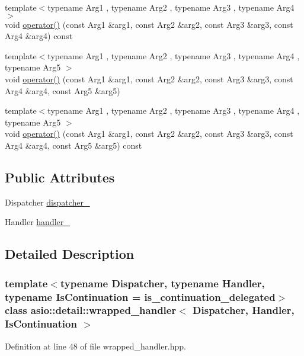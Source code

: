 \begin{DoxyCompactItemize}
\item 
{\footnotesize template$<$typename Arg1 , typename Arg2 , typename Arg3 , typename Arg4 $>$ }\\void \hyperlink{classasio_1_1detail_1_1wrapped__handler_a52b441e6137fb8753bb75648bbd1c98d}{operator()} (const Arg1 \&arg1, const Arg2 \&arg2, const Arg3 \&arg3, const Arg4 \&arg4) const 
\item 
{\footnotesize template$<$typename Arg1 , typename Arg2 , typename Arg3 , typename Arg4 , typename Arg5 $>$ }\\void \hyperlink{classasio_1_1detail_1_1wrapped__handler_a63973584d48d19bee721adb2448d73f3}{operator()} (const Arg1 \&arg1, const Arg2 \&arg2, const Arg3 \&arg3, const Arg4 \&arg4, const Arg5 \&arg5)
\item 
{\footnotesize template$<$typename Arg1 , typename Arg2 , typename Arg3 , typename Arg4 , typename Arg5 $>$ }\\void \hyperlink{classasio_1_1detail_1_1wrapped__handler_a381c918e444879c3b5d1a2a008533d84}{operator()} (const Arg1 \&arg1, const Arg2 \&arg2, const Arg3 \&arg3, const Arg4 \&arg4, const Arg5 \&arg5) const 
\end{DoxyCompactItemize}
\subsection*{Public Attributes}
\begin{DoxyCompactItemize}
\item 
Dispatcher \hyperlink{classasio_1_1detail_1_1wrapped__handler_a1b5a895a84ecb42ec106dedb0d71bc99}{dispatcher\+\_\+}
\item 
Handler \hyperlink{classasio_1_1detail_1_1wrapped__handler_ad69cf050b6945ca618f0015ca2c28f98}{handler\+\_\+}
\end{DoxyCompactItemize}


\subsection{Detailed Description}
\subsubsection*{template$<$typename Dispatcher, typename Handler, typename Is\+Continuation = is\+\_\+continuation\+\_\+delegated$>$class asio\+::detail\+::wrapped\+\_\+handler$<$ Dispatcher, Handler, Is\+Continuation $>$}



Definition at line 48 of file wrapped\+\_\+handler.\+hpp.



